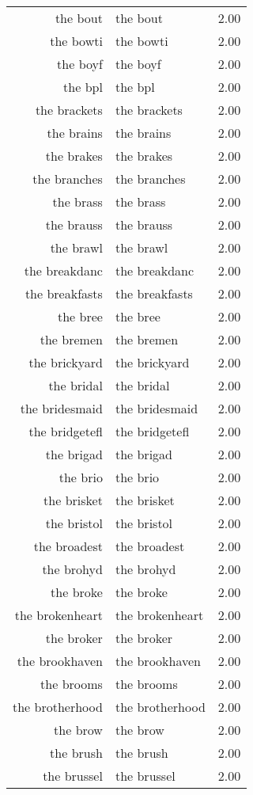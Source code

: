 \begin{table}[ht]
\begin{tabular}{rlr}
  the bout & the bout & 2.00 \\ 
  the bowti & the bowti & 2.00 \\ 
  the boyf & the boyf & 2.00 \\ 
  the bpl & the bpl & 2.00 \\ 
  the brackets & the brackets & 2.00 \\ 
  the brains & the brains & 2.00 \\ 
  the brakes & the brakes & 2.00 \\ 
  the branches & the branches & 2.00 \\ 
  the brass & the brass & 2.00 \\ 
  the brauss & the brauss & 2.00 \\ 
  the brawl & the brawl & 2.00 \\ 
  the breakdanc & the breakdanc & 2.00 \\ 
  the breakfasts & the breakfasts & 2.00 \\ 
  the bree & the bree & 2.00 \\ 
  the bremen & the bremen & 2.00 \\ 
  the brickyard & the brickyard & 2.00 \\ 
  the bridal & the bridal & 2.00 \\ 
  the bridesmaid & the bridesmaid & 2.00 \\ 
  the bridgetefl & the bridgetefl & 2.00 \\ 
  the brigad & the brigad & 2.00 \\ 
  the brio & the brio & 2.00 \\ 
  the brisket & the brisket & 2.00 \\ 
  the bristol & the bristol & 2.00 \\ 
  the broadest & the broadest & 2.00 \\ 
  the brohyd & the brohyd & 2.00 \\ 
  the broke & the broke & 2.00 \\ 
  the brokenheart & the brokenheart & 2.00 \\ 
  the broker & the broker & 2.00 \\ 
  the brookhaven & the brookhaven & 2.00 \\ 
  the brooms & the brooms & 2.00 \\ 
  the brotherhood & the brotherhood & 2.00 \\ 
  the brow & the brow & 2.00 \\ 
  the brush & the brush & 2.00 \\ 
  the brussel & the brussel & 2.00 \\ 

\end{tabular}
\end{table}
